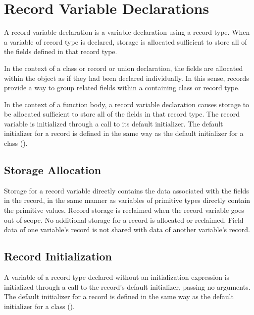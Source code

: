 \section{Record Variable Declarations}
\label{Record_Variable_Declarations}

A record variable declaration is a variable declaration using a record type.
When a variable of record type is declared, storage is allocated sufficient to
store all of the fields defined in that record type.  

In the context of a class or record or union declaration, the fields are
allocated within the object as if they had been declared individually.  In this
sense, records provide a way to group related fields within a containing class
or record type. 

In the context of a function body, a record variable declaration
causes storage to be allocated sufficient to store all of the fields in that
record type.  The record variable is initialized through a call to its
default initializer.  The default initializer for a record is defined in the
same way as the default initializer for a class ().

\subsection{Storage Allocation}
\label{Record_Storage}

Storage for a record variable directly contains the data associated
with the fields in the record, in the same manner as variables
of primitive types directly contain the primitive values.
Record storage is reclaimed when the record variable goes out of scope.
No additional storage for a record is allocated or reclaimed.
Field data of one variable's record is not shared with data
of another variable's record.

\subsection{Record Initialization}
\label{Record_Initialization}

A variable of a record type declared without an initialization expression
is initialized through a call to the record's default initializer, passing no arguments.
The default initializer for a record is defined in the same way as the default
initializer for a class ().

